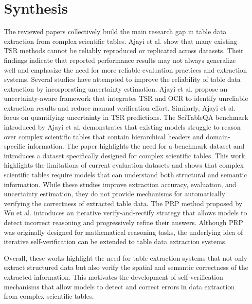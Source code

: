 \documentclass[12pt]{article}
\begin{document}
\section{Synthesis}
The reviewed papers collectively build the main research gap in table data extraction from complex scientific tables. Ajayi et al. \cite{ajayi2023studyreproducibilityreplicabilitytable} show that many existing TSR methods cannot be reliably reproduced or replicated across datasets. Their findings indicate that reported performance results may not always generalize well and emphasize the need for more reliable evaluation practices and extraction systems.
Several studies have attempted to improve the reliability of table data extraction by incorporating uncertainty estimation. Ajayi et al. \cite{ajayi2025uncertaintyawarecomplexscientifictable} propose an uncertainty-aware framework that integrates TSR and OCR to identify unreliable extraction results and reduce manual verification effort. Similarly, Ajayi et al. \cite{ajayi2024uncertaintyquantificationtablestructure} focus on quantifying uncertainty in TSR predictions. 
The SciTableQA benchmark introduced by Ajayi et al. \cite{Ajayi2025SciTableQAAQ} demonstrates that existing models struggle to reason over complex scientific tables that contain hierarchical headers and domain-specific information. The paper highlights the need for a benchmark dataset and introduces a dataset specifically designed for complex scientific tables. This work highlights the limitations of current evaluation datasets and shows that complex scientific tables require models that can understand both structural and semantic information.
While these studies improve extraction accuracy, evaluation, and uncertainty estimation, they do not provide mechanisms for automatically verifying the correctness of extracted table data. The PRP method proposed by Wu et al. \cite{wu2023mathprogressiverectificationprompting} introduces an iterative verify-and-rectify strategy that allows models to detect incorrect reasoning and progressively refine their answers. Although PRP was originally designed for mathematical reasoning tasks, the underlying idea of iterative self-verification can be extended to table data extraction systems.

Overall, these works highlight the need for table extraction systems that not only extract structured data but also verify the spatial and semantic correctness of the extracted information. This motivates the development of self-verification mechanisms that allow models to detect and correct errors in data extraction from complex scientific tables.


\end{document}

